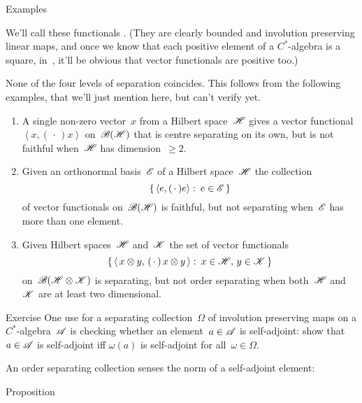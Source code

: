 \documentclass[a]{subfiles}
\begin{document}
\begin{parsec}
\begin{point}{Examples}
\begin{enumerate}
We'll call these functionals
%
%
.
(They are clearly bounded
and involution preserving linear maps,
and once we know that each positive element of a $C^*$-algebra
is a square, in~,
it'll be obvious that vector functionals
are positive too.)
\end{enumerate}
\begin{point}
None of the four levels of separation
coincides.
This follows from the following examples,
that we'll just mention here,
but can't verify yet.
\begin{enumerate}
\item
A single non-zero vector~$x$ from a Hilbert space~$\mathscr{H}$
gives a vector functional $\left<x,(\,\cdot\,)x\right>$
on~$\mathscr{B}(\mathscr{H})$ that is centre separating
on its own, but is not faithful when~$\mathscr{H}$ has dimension~$\geq 2$.
\item
Given an orthonormal basis~$\mathscr{E}$
of a Hilbert space~$\mathscr{H}$
		the collection 
\begin{equation*}
	\{\,\left<e,(\,\cdot\,)e\right>\colon\,e\in\mathscr{E}\,\}
\end{equation*}
		of vector functionals on~$\mathscr{B}(\mathscr{H})$
		is faithful, but not separating when~$\mathscr{E}$
		has more than one element.
\item
Given Hilbert spaces~$\mathscr{H}$
and~$\mathscr{K}$
the set of vector functionals
\begin{equation*}
	\{\,\left<\,x\otimes y,\,(\,\cdot\,)\,x\otimes y\,\right>\colon\,
x\in\mathscr{H},\,y\in\mathscr{K}\,\}
\end{equation*}
on~$\mathscr{B}(\mathscr{H}\otimes\mathscr{K})$
is separating,
but not order separating
when both~$\mathscr{H}$ and~$\mathscr{K}$
are at least two dimensional.
\end{enumerate}
\end{point}
\end{point}
\begin{point}{Exercise}%
One use for 
a separating collection~$\Omega$
of involution preserving maps
on a $C^*$-algebra~$\mathscr{A}$
is checking whether an element~$a\in\mathscr{A}$
is self-adjoint:
show that $a\in\mathscr{A}$ is self-adjoint
iff $\omega(a)$ is self-adjoint for all~$\omega\in\Omega$.
\end{point}
\begin{point}%
An order separating
collection senses the norm 
of a self-adjoint element:
\end{point}
\begin{point}{Proposition}%

\end{point}
\end{parsec}
\end{document}

